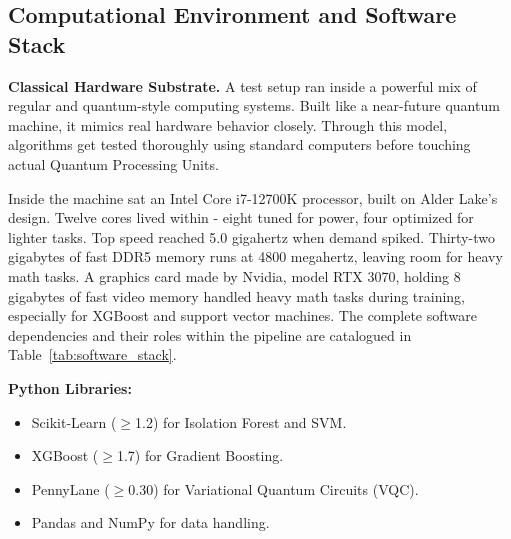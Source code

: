 \documentclass[journal,onecolumn]{IEEEtran}
\begin{document}
\subsection{Computational Environment and Software Stack}

\textbf{Classical Hardware Substrate.}
A test setup ran inside a powerful mix of regular and quantum-style computing systems. Built like a near-future quantum machine, it mimics real hardware behavior closely. Through this model, algorithms get tested thoroughly using standard computers before touching actual Quantum Processing Units.

Inside the machine sat an Intel Core i7-12700K processor, built on Alder Lake's design. Twelve cores lived within - eight tuned for power, four optimized for lighter tasks. Top speed reached 5.0 gigahertz when demand spiked. Thirty-two gigabytes of fast DDR5 memory runs at 4800 megahertz, leaving room for heavy math tasks. A graphics card made by Nvidia, model RTX 3070, holding 8 gigabytes of fast video memory handled heavy math tasks during training, especially for XGBoost and support vector machines. The complete software dependencies and their roles within the pipeline are catalogued in Table~\ref{tab:software_stack}.

\textbf{Python Libraries:}
\begin{itemize}
\item Scikit-Learn ($\geq$1.2) for Isolation Forest and SVM.
\item XGBoost ($\geq$1.7) for Gradient Boosting.
\item PennyLane ($\geq$0.30) for Variational Quantum Circuits (VQC).
\item Pandas and NumPy for data handling.
\end{itemize}

\begin{table}[h]
\centering
\caption{Software Stack Specifications and Pipeline Roles}
\label{tab:software_stack}
\footnotesize
\setlength{\tabcolsep}{3pt}
\renewcommand{\arraystretch}{1.1}

\end{table}
\end{document}
